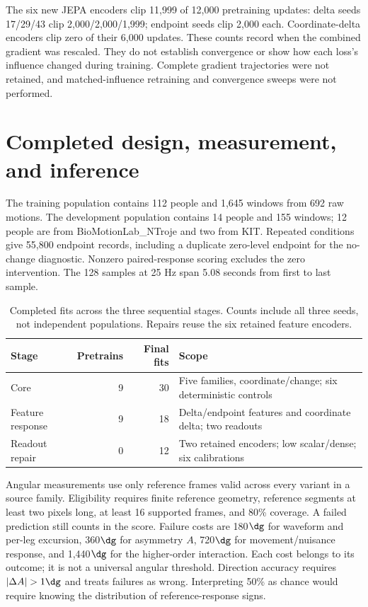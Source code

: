 The six new JEPA encoders clip 11,999 of 12,000 pretraining updates: delta seeds 17/29/43 clip 2,000/2,000/1,999; endpoint seeds clip 2,000 each. Coordinate-delta encoders clip zero of their 6,000 updates. These counts record when the combined gradient was rescaled. They do not establish convergence or show how each loss's influence changed during training. Complete gradient trajectories were not retained, and matched-influence retraining and convergence sweeps were not performed.

\clearpage
\section{Completed design, measurement, and inference}
\label{app:evaluation}
The training population contains 112 people and 1,645 windows from 692 raw motions. The development population contains 14 people and 155 windows; 12 people are from BioMotionLab\_NTroje and two from KIT. Repeated conditions give 55,800 endpoint records, including a duplicate zero-level endpoint for the no-change diagnostic. Nonzero paired-response scoring excludes the zero intervention. The 128 samples at 25 Hz span 5.08 seconds from first to last sample.

\begin{table}[h]\centering\small
\caption{Completed fits across the three sequential stages. Counts include all three seeds, not independent populations. Repairs reuse the six retained feature encoders.}
\begin{tabular}{lrrl}\toprule
Stage & Pretrains & Final fits & Scope \\\midrule
Core &9&30&Five families, coordinate/change; six deterministic controls\\
Feature response &9&18&Delta/endpoint features and coordinate delta; two readouts\\
Readout repair &0&12&Two retained encoders; low scalar/dense; six calibrations\\\bottomrule
\end{tabular}
\end{table}

Angular measurements use only reference frames valid across every variant in a source family. Eligibility requires finite reference geometry, reference segments at least two pixels long, at least 16 supported frames, and 80\% coverage. A failed prediction still counts in the score. Failure costs are 180$\dg$ for waveform and per-leg excursion, 360$\dg$ for asymmetry $A$, 720$\dg$ for movement/nuisance response, and 1,440$\dg$ for the higher-order interaction. Each cost belongs to its outcome; it is not a universal angular threshold. Direction accuracy requires $|\Delta A|>1\dg$ and treats failures as wrong. Interpreting 50\% as chance would require knowing the distribution of reference-response signs.

